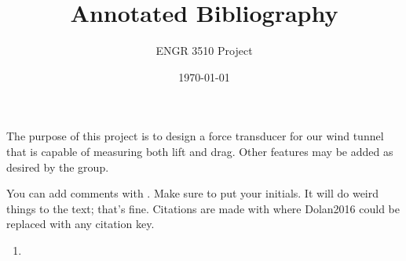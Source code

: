\documentclass[12pt,letterpaper]{article}
\begin{document}
\title{Annotated Bibliography}
\author{ENGR 3510 Project}
\date{\today}
\maketitle

The purpose of this project is to design a force transducer for our wind tunnel that is capable of measuring both lift and drag. Other features may be added as desired by the group.

You can add comments with . Make sure to put your initials. It will do weird things to the text; that's fine. 
Citations are made with \cite{Dolan2016} where Dolan2016 could be replaced with any citation key. 


\begin{enumerate}
	\item \cite{Nan2013}
\end{enumerate}

\printbibliography
\end{document}
